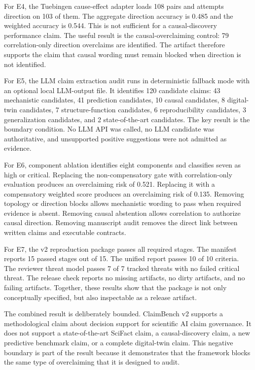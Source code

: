 For E4, the Tuebingen cause-effect adapter loads 108 pairs and attempts direction on 103 of them. The aggregate direction accuracy is 0.485 and the weighted accuracy is 0.544. This is not sufficient for a causal-discovery performance claim. The useful result is the causal-overclaiming control: 79 correlation-only direction overclaims are identified. The artifact therefore supports the claim that causal wording must remain blocked when direction is not identified.

For E5, the LLM claim extraction audit runs in deterministic fallback mode with an optional local LLM-output file. It identifies 120 candidate claims: 43 mechanistic candidates, 41 prediction candidates, 10 causal candidates, 8 digital-twin candidates, 7 structure-function candidates, 6 reproducibility candidates, 3 generalization candidates, and 2 state-of-the-art candidates. The key result is the boundary condition. No LLM API was called, no LLM candidate was authoritative, and unsupported positive suggestions were not admitted as evidence.

For E6, component ablation identifies eight components and classifies seven as high or critical. Replacing the non-compensatory gate with correlation-only evaluation produces an overclaiming risk of 0.521. Replacing it with a compensatory weighted score produces an overclaiming risk of 0.135. Removing topology or direction blocks allows mechanistic wording to pass when required evidence is absent. Removing causal abstention allows correlation to authorize causal direction. Removing manuscript audit removes the direct link between written claims and executable contracts.



For E7, the v2 reproduction package passes all required stages. The manifest reports 15 passed stages out of 15. The unified report passes 10 of 10 criteria. The reviewer threat model passes 7 of 7 tracked threats with no failed critical threat. The release check reports no missing artifacts, no dirty artifacts, and no failing artifacts. Together, these results show that the package is not only conceptually specified, but also inspectable as a release artifact.

The combined result is deliberately bounded. ClaimBench v2 supports a methodological claim about decision support for scientific AI claim governance. It does not support a state-of-the-art SciFact claim, a causal-discovery claim, a new predictive benchmark claim, or a complete digital-twin claim. This negative boundary is part of the result because it demonstrates that the framework blocks the same type of overclaiming that it is designed to audit.
